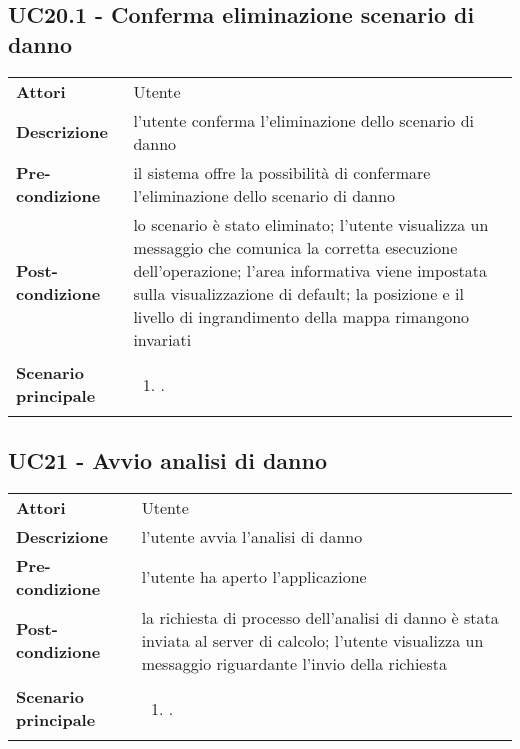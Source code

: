 \subsection{UC20.1 - Conferma eliminazione scenario di danno} 
\label{sssec:UC20.1} 
\def\arraystretch{1.5}
\begin{tabularx}{\textwidth}{l|p{}}
	\rowcolor{I} \multicolumn{2}{c}{\color{white}\textbf{UC20.1 - Conferma eliminazione scenario di danno}} \\
	\toprule
	\endhead
	\textbf{Attori} & Utente\\
	\textbf{Descrizione} & l'utente conferma l'eliminazione dello scenario di danno\\
	\textbf{Pre-condizione} & il sistema offre la possibilità di confermare l'eliminazione dello scenario di danno\\
	\textbf{Post-condizione} & lo scenario è stato eliminato; l'utente visualizza un messaggio che comunica la corretta esecuzione dell'operazione;  l'area informativa viene impostata sulla visualizzazione di default;  la posizione e il livello di ingrandimento della mappa rimangono invariati\\
		\textbf{Scenario principale} & \vspace{-1.2em}\begin{enumerate}[leftmargin=*,noitemsep,nosep]
		\item \nameref{sssec:UC20.1}.
	\end{enumerate}\\
	\bottomrule
\end{tabularx}
\subsection{UC21 - Avvio analisi di danno} 
\label{sssec:UC21} 
\def\arraystretch{1.5}
\begin{tabularx}{\textwidth}{l|p{}}
	\rowcolor{I} \multicolumn{2}{c}{\color{white}\textbf{UC21 - Avvio analisi di danno}} \\
	\toprule
	\endhead
	\textbf{Attori} & Utente\\
	\textbf{Descrizione} & l'utente avvia l'analisi di danno\\
	\textbf{Pre-condizione} & l'utente ha aperto l'applicazione\\
	\textbf{Post-condizione} & la richiesta di processo dell'analisi di danno è stata inviata al server di calcolo; l'utente visualizza un messaggio riguardante l'invio della richiesta\\
	\textbf{Scenario principale} & \vspace{-1.2em}\begin{enumerate}[leftmargin=*,noitemsep,nosep]
		\item \nameref{sssec:UC21}.
	\end{enumerate}\\
	\bottomrule
\end{tabularx}
